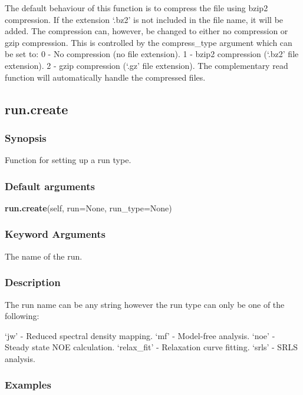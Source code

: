 The default behaviour of this function is to compress the file using bzip2 compression.  If
the extension `.bz2' is not included in the file name, it will be added.  The compression
can, however, be changed to either no compression or gzip compression.  This is controlled
by the compress\_type argument which can be set to:
    0 - No compression (no file extension).
    1 - bzip2 compression (`.bz2' file extension).
    2 - gzip compression (`.gz' file extension).
The complementary read function will automatically handle the compressed files.


\newpage

\subsection{run.create}


\subsubsection{Synopsis}

Function for setting up a run type.

\subsubsection{Default arguments}

\textsf{\textbf{run.create}(self, run=None, run\_type=None)}


\subsubsection{Keyword Arguments}

  The name of the run.


\subsubsection{Description}

The run name can be any string however the run type can only be one of the following:

    `jw' - Reduced spectral density mapping.
    `mf' - Model-free analysis.
    `noe' - Steady state NOE calculation.
    `relax\_fit' - Relaxation curve fitting.
    `srls' - SRLS analysis.


\subsubsection{Examples}

